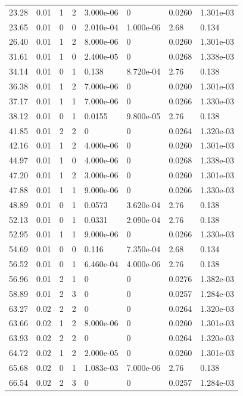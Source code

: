 \documentclass[preview]{standalone}
\begin{document}
{{\begin{tabular}{L{1.2cm}C{1.2cm} C{0.3cm}C{0.5cm} C{1.4cm}C{1.4cm} C{1.4cm}C{1.4cm}}
  23.28  &  0.01  & 1     &  2 &  3.000e-06  & 0  & 0.0260 &  1.301e-03   \\ 
  23.65  &  0.01  & 0     &  0 &  2.010e-04  & 1.000e-06  & 2.68 &  0.134   \\ 
  26.40  &  0.01  & 1     &  2 &  8.000e-06  & 0  & 0.0260 &  1.301e-03   \\ 
  31.61  &  0.01  & 1     &  0 &  2.400e-05  & 0  & 0.0268 &  1.338e-03   \\ 
  34.14  &  0.01  & 0     &  1 &  0.138  & 8.720e-04  & 2.76 &  0.138   \\ 
  36.38  &  0.01  & 1     &  2 &  7.000e-06  & 0  & 0.0260 &  1.301e-03   \\ 
  37.17  &  0.01  & 1     &  1 &  7.000e-06  & 0  & 0.0266 &  1.330e-03   \\ 
  38.12  &  0.01  & 0     &  1 &  0.0155  & 9.800e-05  & 2.76 &  0.138   \\ 
  41.85  &  0.01  & 2     &  2 &  0  & 0  & 0.0264 &  1.320e-03   \\ 
  42.16  &  0.01  & 1     &  2 &  4.000e-06  & 0  & 0.0260 &  1.301e-03   \\ 
  44.97  &  0.01  & 1     &  0 &  4.000e-06  & 0  & 0.0268 &  1.338e-03   \\ 
  47.20  &  0.01  & 1     &  2 &  3.000e-06  & 0  & 0.0260 &  1.301e-03   \\ 
  47.88  &  0.01  & 1     &  1 &  9.000e-06  & 0  & 0.0266 &  1.330e-03   \\ 
  48.89  &  0.01  & 0     &  1 &  0.0573  & 3.620e-04  & 2.76 &  0.138   \\ 
  52.13  &  0.01  & 0     &  1 &  0.0331  & 2.090e-04  & 2.76 &  0.138   \\ 
  52.95  &  0.01  & 1     &  1 &  9.000e-06  & 0  & 0.0266 &  1.330e-03   \\ 
  54.69  &  0.01  & 0     &  0 &  0.116  & 7.350e-04  & 2.68 &  0.134   \\ 
  56.52  &  0.01  & 0     &  1 &  6.460e-04  & 4.000e-06  & 2.76 &  0.138   \\ 
  56.96  &  0.01  & 2     &  1 &  0  & 0  & 0.0276 &  1.382e-03   \\ 
  58.89  &  0.01  & 2     &  3 &  0  & 0  & 0.0257 &  1.284e-03   \\ 
  63.27  &  0.02  & 2     &  2 &  0  & 0  & 0.0264 &  1.320e-03   \\ 
  63.66  &  0.02  & 1     &  2 &  8.000e-06  & 0  & 0.0260 &  1.301e-03   \\ 
  63.93  &  0.02  & 2     &  2 &  0  & 0  & 0.0264 &  1.320e-03   \\ 
  64.72  &  0.02  & 1     &  2 &  2.000e-05  & 0  & 0.0260 &  1.301e-03   \\ 
  65.68  &  0.02  & 0     &  1 &  1.083e-03  & 7.000e-06  & 2.76 &  0.138   \\ 
  66.54  &  0.02  & 2     &  3 &  0  & 0  & 0.0257 &  1.284e-03   \\ 
\hline 
\end{tabular} 

}}
\end{document}
